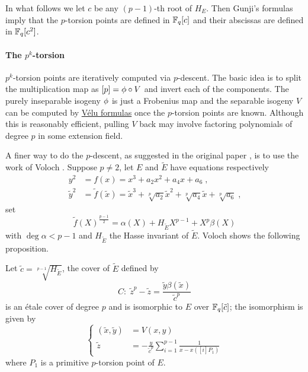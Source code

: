 In what follows we let $c$ be any $(p-1)$-th root of $H_E$. Then
Gunji's formulas imply that the $p$-torsion points are defined in
$\mathbb{F}_q[c]$ and their abscissas are defined in $\mathbb{F}_q[c^2]$.


\paragraph{The $p^k$-torsion}
$p^k$-torsion points are iteratively computed via $p$-descent. The
basic idea is to split the multiplication map as $[p] = \phi\circ
V$ and invert each of the components. The purely inseparable isogeny
$\phi$ is just a Frobenius map and the separable isogeny $V$ can
be computed by \hyperref[sec:velu-formulas]{Vélu formulas} once the
$p$-torsion points are known. Although this is reasonably efficient,
pulling $V$ back may involve factoring polynomials of degree $p$ in
some extension field.

A finer way to do the $p$-descent, as suggested in the original paper
\cite{couveignes96}, is to use the work of Voloch
\cite{voloch90}. Suppose $p\ne2$, let $E$ and $\widetilde{E}$ have
equations respectively
\begin{align*}
  y^2&=f(x)=x^3+a_2x^2+a_4x+a_6 \;\text{,}\\
  \tilde{y}^2&=\tilde{f}(\tilde{x}) = \tilde{x}^3 +
  \sqrt[p]{a_2}\tilde{x}^2 + \sqrt[p]{a_4}\tilde{x} + \sqrt[p]{a_6}
  \;\text{,}
\end{align*}
set
 \begin{equation}
  \label{eq:voloch:cover}
  \tilde{f}(X)^{\frac{p-1}{2}} = \alpha(X) + H_{\widetilde{E}}X^{p-1} + X^p\beta(X)
\end{equation}
with $\deg \alpha < p-1$ and $H_{\widetilde{E}}$ the Hasse invariant
of $\widetilde{E}$. Voloch shows the following proposition.

\begin{proposition}
  \label{th:voloch}
  Let $\tilde{c} = \sqrt[p-1]{H_{\widetilde{E}}}$, the cover of
  $\widetilde{E}$ defined by
  \begin{equation}
    \label{th:voloch:cover}
    C:\; \tilde{z}^p - \tilde{z} = \frac{\tilde{y}\beta(\tilde{x})}{\tilde{c}^p}
  \end{equation}
  is an étale cover of degree $p$ and is isomorphic to $E$ over
  $\mathbb{F}_q[\tilde{c}]$; the isomorphism is given by
  \begin{equation}
    \label{th:voloch:isom}
    \left\{
      \begin{aligned}
        (\tilde{x}, \tilde{y}) &= V(x, y)\\
        \tilde{z} &= -\frac{y}{\tilde{c}^p}\sum_{i=1}^{p-1}\frac{1}{x - x([i]P_1)}
      \end{aligned}
    \right.
  \end{equation}
  where $P_1$ is a primitive $p$-torsion point of $E$.
\end{proposition}

